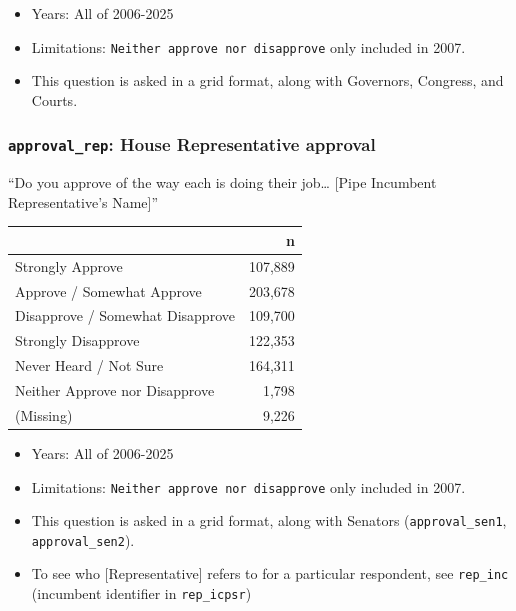 \documentclass[10pt,article,oneside]{memoir}
\begin{document}
\begin{itemize}
\tightlist
\item
  Years: All of 2006-2025
\item
  Limitations: \texttt{Neither\ approve\ nor\ disapprove} only included
  in 2007.
\item
  This question is asked in a grid format, along with Governors,
  Congress, and Courts.
\end{itemize}

\subsubsection{\texorpdfstring{\texttt{approval\_rep}: House
Representative
approval}{approval\_rep: House Representative approval}}\label{approval_rep-house-representative-approval}

``Do you approve of the way each is doing their job\ldots{} {[}Pipe
Incumbent Representative's Name{]}''

\begin{table}[H]
\centering
\begin{tabular}[t]{lr}
\toprule
 & n\\
\midrule
Strongly Approve & 107,889\\
Approve / Somewhat Approve & 203,678\\
Disapprove / Somewhat Disapprove & 109,700\\
Strongly Disapprove & 122,353\\
Never Heard / Not Sure & 164,311\\
Neither Approve nor Disapprove & 1,798\\
(Missing) & 9,226\\
\bottomrule
\end{tabular}
\end{table}

\begin{itemize}
\tightlist
\item
  Years: All of 2006-2025
\item
  Limitations: \texttt{Neither\ approve\ nor\ disapprove} only included
  in 2007.
\item
  This question is asked in a grid format, along with Senators
  (\texttt{approval\_sen1}, \texttt{approval\_sen2}).
\item
  To see who {[}Representative{]} refers to for a particular respondent,
  see \texttt{rep\_inc} (incumbent identifier in \texttt{rep\_icpsr})
\end{itemize}
\end{document}
